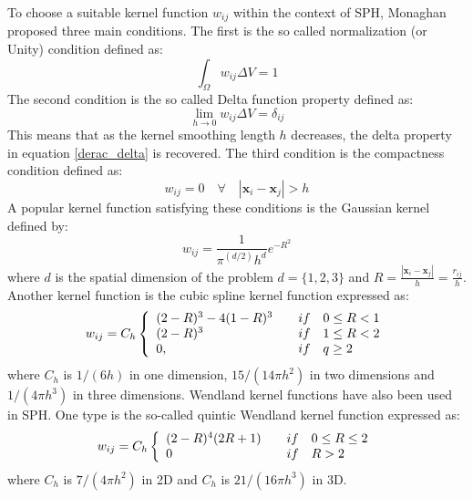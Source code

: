 \documentclass[12pt]{extarticle}
\begin{document}
\vspace{5 mm}
To choose a suitable kernel function $w_{ij}$ within the context of SPH, Monaghan proposed three main conditions. The first is the so called normalization (or Unity) condition defined as:
\begin{equation}
\int_{\Omega} w_{ij} \Delta V = 1
\end{equation}
The second condition is the so called Delta function property defined as:
\begin{equation}
\lim_{h \rightarrow 0} w_{ij} \Delta V = \delta_{ij}
\end{equation}
This means that as the kernel smoothing length $h$ decreases, the delta property in equation \ref{derac_delta} is recovered. The third condition is the compactness condition defined as:
\begin{equation}
w_{ij} = 0  \quad \forall \quad |\textbf{x}_{i} - \textbf{x}_{j}| > h
\end{equation}
A popular kernel function satisfying these conditions is the Gaussian kernel defined by:
\begin{equation}
    w_{ij} = \frac{1}{\pi^{(d/2)}h^d} e^{-R^2}
\label{GaussKernel0}
\end{equation}
where $d$ is the spatial dimension of the problem $d =\{1,2,3 \}$ and $R = \frac{|\textbf{x}_{i}-\textbf{x}_{j}|}{h} = \frac{r_{ij}}{h}$. Another kernel function is the cubic spline kernel function expressed as:
\[ w_{ij} = C_{h} \left\{
  \begin{array}{l l l}
    (2-R)^{3}-4(1-R)^{3} & \quad if & 0 \leq R < 1 \\
     (2-R)^{3} & \quad if & 1\leq R < 2 \\
    0, & \quad if & q \geq 2
  \end{array} \right.\]
\begin{equation}
\label{CubicSpline0}
\end{equation}
where $C_{h}$ is $1/(6h)$ in one dimension, $15/(14 \pi h^2)$ in two dimensions and $1/(4 \pi h^{3})$ in three dimensions. Wendland kernel functions have also been used in SPH. One type is the so-called quintic Wendland kernel function expressed as:
\[ w_{ij} = C_{h} \left\{
  \begin{array}{l l l}
    (2-R)^{4} (2R + 1) & \quad if & 0 \leq R \leq 2 \\
    0 & \quad if & R > 2 \\
  \end{array} \right.\]
\begin{equation}
\label{Wendland0}
\end{equation}
where $C_{h}$ is $7/(4 \pi h^{2})$ in 2D and $C_{h}$ is $21/(16 \pi h^{3})$ in 3D.
\end{document}
